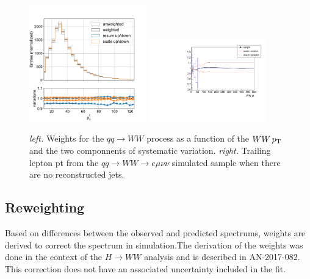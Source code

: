 \begin{figure}[ht]
    \centering
    \includegraphics[width=0.45\textwidth]{chapters/3_dataAndSimulation/figures/ww_pt_lepton_pt}
    \includegraphics[width=0.45\textwidth]{chapters/3_dataAndSimulation/figures/ww_pt_weight_variations}
    \caption{\emph{left.} Weights for the $qq\rightarrow WW$ process as a function of the $WW\,p_{\mathrm{T}}$ and the two componnents of systematic variation.  \emph{right.} Trailing lepton pt from the $qq\rightarrow WW\rightarrow e\mu\nu\nu$ simulated sample when there are no reconstructed jets.} 
    \label{fig:dat:ww_weight}
\end{figure}



\subsection{\cPZ \pt Reweighting}
Based on differences between the observed and predicted \PZ \pt spectrums, weights are derived to correct the \pt spectrum in simulation.The derivation of the weights was done in the context of the $H\rightarrow WW$ analysis and is described in AN-2017-082. This correction does not have an associated uncertainty included in the fit.

